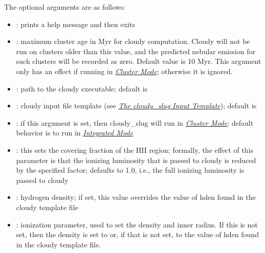 \documentclass[letterpaper,10pt,english]{sphinxmanual}
\begin{document}
The optional arguments are as follows:
\begin{itemize}
\item {} 
: prints a help message and then exits

\item {} 
: maximum cluster age in Myr for
cloudy computation. Cloudy will not be run on clusters older than
this value, and the predicted nebular emission for such clusters
will be recorded as zero. Default value is 10 Myr. This argument only
has an effect if running in {\hyperref[cloudy:sssec\string-cloudy\string-cluster\string-mode]{\emph{Cluster Mode}}};
otherwise it is ignored.

\item {} 
: path to the cloudy executable; default
is 

\item {} 
: cloudy input file template (see
{\hyperref[cloudy:ssec\string-cloudy\string-template]{\emph{The cloudy\_slug Input Template}}}); default is

\item {} 
: if this argument is set, then cloudy\_slug
will run in {\hyperref[cloudy:sssec\string-cloudy\string-cluster\string-mode]{\emph{Cluster Mode}}}; default behavior is to
run in {\hyperref[cloudy:sssec\string-cloudy\string-integrated\string-mode]{\emph{Integrated Mode}}}

\item {} 
: this sets the
covering fraction of the HII region; formally, the effect of this
parameter is that the ionizing luminosity that is passed to cloudy
is reduced by the specified factor; defaults to 1.0, i.e., the full
ionizing luminosity is passed to cloudy

\item {} 
: hydrogen density; if set, this value
overrides the value of hden found in the cloudy template file

\item {} 
: ionization parameter, used to
set the density and inner radius. If this is not set, then the
density is set to  or, if that is not set, to the value of
hden found in the cloudy template file.


\end{itemize}
\end{document}
